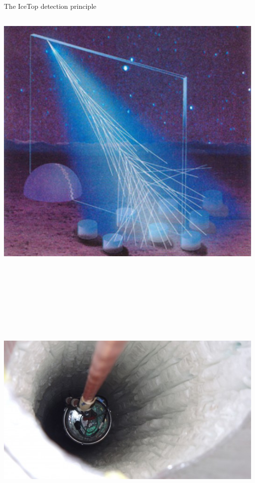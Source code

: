 \Tr
\onecolumn
\begin{center}
{\blue The IceTop detection principle}\\[5mm] 
\includegraphics[keepaspectratio,height=14cm]{cr-shower}
\end{center}

\Tr
\onecolumn
\begin{center}
\includegraphics[keepaspectratio,height=14cm]{hole2}
\end{center}

